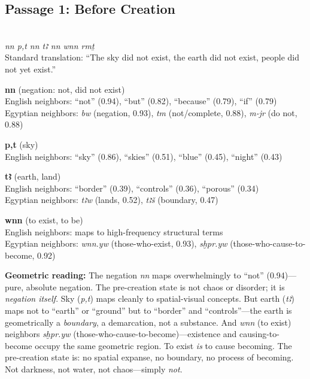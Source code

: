 \documentclass[11pt, a4paper]{article}
\newcommand{\passagehiero}[1]{{\normalfont\hierofont\fontsize{14}{17}\selectfont #1}}
\begin{document}
\subsection{Passage 1: Before Creation}

{\color{passage}\passagehiero{𓈖𓈖 𓇯𓏏 𓈖𓈖 𓇾 𓈖𓈖 𓃹𓈖𓈖 𓂋𓅓𓏏𓀀𓏥}\\\medskip
\textit{\small nn p,t nn tꜣ nn wnn rmṯ}\\
Standard translation: ``The sky did not exist, the earth did not exist, people did not yet exist.''}

\bigskip

\noindent\textbf{nn} (negation: not, did not exist)\\
English neighbors: ``not'' (0.94), ``but'' (0.82), ``because'' (0.79), ``if'' (0.79)\\
Egyptian neighbors: \textit{bw} (negation, 0.93), \textit{tm} (not/complete, 0.88), \textit{m-jr} (do not, 0.88)

\medskip

\noindent\textbf{p,t} (sky)\\
English neighbors: ``sky'' (0.86), ``skies'' (0.51), ``blue'' (0.45), ``night'' (0.43)

\medskip

\noindent\textbf{tꜣ} (earth, land)\\
English neighbors: ``border'' (0.39), ``controls'' (0.36), ``porous'' (0.34)\\
Egyptian neighbors: \textit{tꜣw} (lands, 0.52), \textit{tꜣš} (boundary, 0.47)

\medskip

\noindent\textbf{wnn} (to exist, to be)\\
English neighbors: maps to high-frequency structural terms\\
Egyptian neighbors: \textit{wnn.yw} (those-who-exist, 0.93), \textit{sḫpr.yw} (those-who-cause-to-become, 0.92)

\medskip

{\color{insight}\textbf{Geometric reading:}} The negation \textit{nn} maps overwhelmingly to ``not'' (0.94)---pure, absolute negation. The pre-creation state is not chaos or disorder; it is \textit{negation itself}. Sky (\textit{p,t}) maps cleanly to spatial-visual concepts. But earth (\textit{tꜣ}) maps not to ``earth'' or ``ground'' but to ``border'' and ``controls''---the earth is geometrically a \textit{boundary}, a demarcation, not a substance. And \textit{wnn} (to exist) neighbors \textit{sḫpr.yw} (those-who-cause-to-become)---existence and causing-to-become occupy the same geometric region. To exist \textit{is} to cause becoming. The pre-creation state is: no spatial expanse, no boundary, no process of becoming. Not darkness, not water, not chaos---simply \textit{not}.
\end{document}
